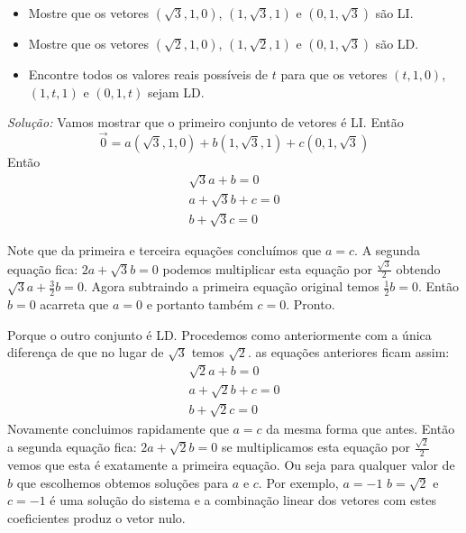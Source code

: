 \documentclass[12pt]{article}
\newcounter{questao}
\newcommand{\quest}{\stepcounter{questao}{\bf \arabic{questao}.\ }}
\begin{document}
\vspace{0.3cm}

\quest \begin{itemize}
    \item Mostre que os vetores $(\sqrt{3}, 1, 0)$, $(1,\sqrt{3}, 1)$ e $(0,1,\sqrt{3})$ são LI.
    
\item Mostre que os vetores $(\sqrt{2}, 1, 0)$, $(1,\sqrt{2}, 1)$ e $(0,1,\sqrt{3})$ são LD.

\item Encontre todos os valores reais possíveis de $t$ para que os vetores $(t, 1, 0)$, $(1,t, 1)$ e $(0,1,t)$ sejam LD.

\end{itemize}

\textit{Solução:} Vamos mostrar que o primeiro conjunto de vetores é LI. Então
\[ \vec{0} = a(\sqrt{3},1,0) + b(1,\sqrt{3},1) + c (0,1,\sqrt{3}) \] 
Então
\begin{gather*}
\sqrt{3}a+b =0 \\
a + \sqrt{3}b + c =0 \\
b + \sqrt{3}c = 0
\end{gather*}

Note que da primeira e terceira equações concluímos que $a=c.$ A segunda equação fica:  $2a + \sqrt{3}b =0$ podemos multiplicar esta equação por $\frac{\sqrt{3}}{2}$ obtendo
$\sqrt{3}a + \frac{3}{2}b = 0$. Agora subtraindo a primeira equação original temos $\frac{1}{2}b=0$. Então $b=0$ acarreta que $a=0$ e portanto também $c=0$. Pronto.

Porque o outro conjunto é LD. Procedemos como anteriormente com a única diferença de que no lugar de $\sqrt{3}$ temos $\sqrt{2}$. as equações anteriores ficam assim:
\begin{gather*}
\sqrt{2}a+b =0 \\
a + \sqrt{2}b + c =0 \\
b + \sqrt{2}c = 0
\end{gather*}
Novamente concluimos rapidamente que $a=c$ da mesma forma que antes. Então a segunda equação fica:
$2a + \sqrt{2}b =0$ se multiplicamos esta equação por $\frac{\sqrt{2}}{2}$ vemos que esta é exatamente a primeira equação. Ou seja para qualquer valor de $b$ que escolhemos obtemos soluções para $a$ e $c$. Por exemplo,  $ a=-1$ $b=\sqrt{2}$ e $c=-1$ é uma solução do sistema e a combinação linear dos vetores com estes coeficientes produz o vetor nulo.



\vspace{0.3cm}
\end{document}
